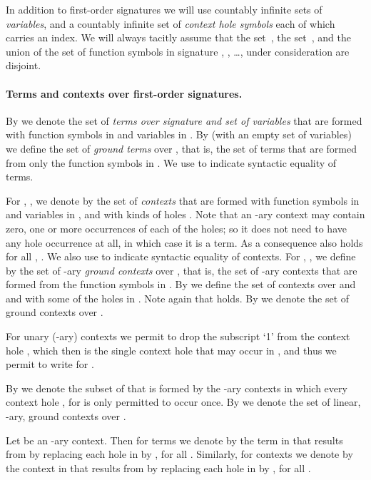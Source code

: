 \documentclass[
submission
]{dmtcs-episciences-tampered}
\newcommand{\nb}{\nobreakdash}
\newcommand{\nary}[1]{{}\nb-ary}
\theoremstyle{plain}
\theoremstyle{definition}
\begin{document}
  In addition to first-order signatures we will use
  countably infinite sets  of \emph{variables},
  and a countably infinite set  of \emph{context hole symbols}
  each of which carries an index.
  We will always tacitly assume that the set~, the set~, 
  and the union of the set of function symbols in signature , , \ldots, under consideration
  are disjoint.
  
  
  
\paragraph{Terms and contexts over first-order signatures.}   
  By  we denote the set of \emph{terms over signature  and set  of variables} 
  that are formed with function symbols in  and variables in .
  By  (with an empty set of variables) we define 
  the set of \emph{ground terms} over ,
  that is, the set of terms that are formed from only the function symbols in .
  We use  to indicate syntactic equality of terms.
  
  For , ,  we denote by  the set of \emph{contexts} 
  that are formed with function symbols in  and variables in ,
  and with  kinds of holes .
  Note that an \nary{n} context may contain zero, one or more occurrences of each of the  holes;
  so it does not need to have any hole occurrence at all, in which case it is a term.
  As a consequence also  holds for all , .
  We also use  to indicate syntactic equality of contexts.
For , , we define by   
  the set of \nary{n} \emph{ground contexts} over ,
  that is, the set of \nary{n} contexts that are formed from the function symbols in .
By 
  we define the set of contexts over  and  and with some of the holes in .
  Note again that  holds.
  By  we denote the set of ground contexts over . 
  
  For unary (\nary{1}) contexts  we permit to drop the subscript `1'
  from the context hole , which then is the single context hole  that may occur in ,
  and thus we permit to write  for . 
  
  By  we denote the subset of  that is formed
  by the \emph{\underline{}} \nary{n} contexts in which every context hole , for 
  is only permitted to occur once. By  we denote the set of linear, \nary{n}, ground contexts over .
  
  Let  be an \nary{n} context.
  Then for terms 
  we denote by  the term in  
  that results from  by replacing each hole  in  by , for all .
  Similarly, for contexts  
  we denote by  the context in  
  that results from  by replacing each hole  in  by , for all .
    
\end{document}
